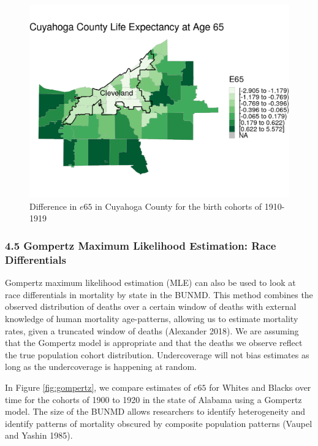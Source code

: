 \documentclass[
  11pt,
]{article}
\begin{document}
\begin{figure}[H]
  \centering
  \includegraphics[width=7in]{../illustrations/micro_geography_cleveland.png}
  \caption{Difference in $e65$ in Cuyahoga County for the birth cohorts of 1910-1919}
  \label{fig:cleveland_life_expectancy}
\end{figure}

\hypertarget{gompertz-maximum-likelihood-estimation-race-differentials}{%
\subsubsection{4.5 Gompertz Maximum Likelihood Estimation: Race
Differentials}\label{gompertz-maximum-likelihood-estimation-race-differentials}}

Gompertz maximum likelihood estimation (MLE) can also be used to look at
race differentials in mortality by state in the BUNMD. This method
combines the observed distribution of deaths over a certain window of
deaths with external knowledge of human mortality age-patterns, allowing
us to estimate mortality rates, given a truncated window of deaths
(Alexander 2018). We are assuming that the Gompertz model is appropriate
and that the deaths we observe reflect the true population cohort
distribution. Undercoverage will not bias estimates as long as the
undercoverage is happening at random.

In Figure \ref{fig:gompertz}, we compare estimates of \(e65\) for Whites
and Blacks over time for the cohorts of 1900 to 1920 in the state of
Alabama using a Gompertz model. The size of the BUNMD allows researchers
to identify heterogeneity and identify patterns of mortality obscured by
composite population patterns (Vaupel and Yashin 1985).
\end{document}
